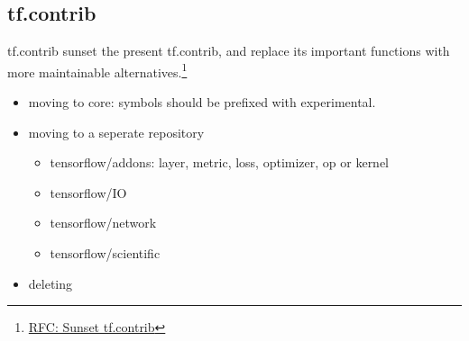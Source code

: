 
\subsection{tf.contrib}

\begin{frame}{tf.contrib}
    sunset the present tf.contrib, and replace its important functions with more maintainable alternatives.\footnote{\href{https://github.com/tensorflow/community/pull/18}{RFC: Sunset tf.contrib}}

    \begin{itemize}
        \item moving to core: symbols should be prefixed with experimental.
        \item moving to a seperate repository
            \begin{itemize}
                \item tensorflow/addons: layer, metric, loss, optimizer, op or kernel
                \item tensorflow/IO
                \item tensorflow/network
                \item tensorflow/scientific
            \end{itemize}
        \item deleting
    \end{itemize}
\end{frame}
